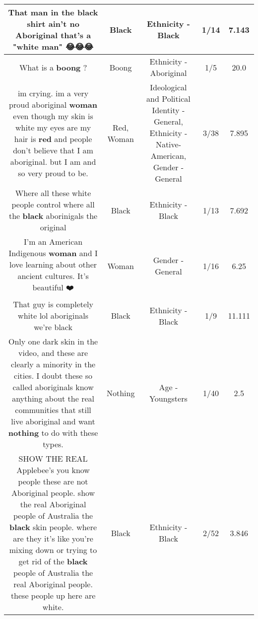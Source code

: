 \documentclass[11pt]{article}
\newlength\mylength
\begin{document}
\begin{center}
\begin{longtable}{|C{.65\mylength}|C{.30\mylength}|C{.12\mylength}|C{.12\mylength}|C{.12\mylength}|}
  \small That man in the \textbf{black} shirt ain't no Aboriginal that's a "white man" 😂😂😂\normalsize   & Black & Ethnicity - Black & 1/14 & 7.143 \\  \hline
  \small What is a \textbf{boong} ?\normalsize   & Boong & Ethnicity - Aboriginal & 1/5 & 20.0 \\  \hline
  \small im crying. im a very proud aboriginal \textbf{woman} even though my skin is white my eyes are my hair is \textbf{r\textbf{ed}} and  people don't believe that I am aboriginal. but I am and so very proud to be.\normalsize   & Red, Woman &  Ideological and Political Identity - General, Ethnicity - Native-American, Gender - General & 3/38 & 7.895 \\  \hline
  \small Where all these white people control where all the \textbf{black} aborinigals the original\normalsize   & Black & Ethnicity - Black & 1/13 & 7.692 \\  \hline
  \small I'm an American Indigenous \textbf{woman} and I love learning about other ancient cultures. It's beautiful ❤️\normalsize   & Woman & Gender - General & 1/16 & 6.25 \\  \hline
  \small That guy is completely white lol aboriginals we're black\normalsize   & Black & Ethnicity - Black & 1/9 & 11.111 \\  \hline
  \small Only one dark skin in the video, and these are clearly a minority in the cities. I doubt these so called aboriginals know anything about the real communities that still live aboriginal and want \textbf{nothing} to do with these types.\normalsize   & Nothing & Age - Youngsters & 1/40 & 2.5 \\  \hline
  \small SHOW THE REAL Applebee's you know people these are not Aboriginal people. show the real Aboriginal people of Australia the \textbf{black} skin people. where are they it's like you're mixing down or trying to get rid of the \textbf{black} people of Australia the real Aboriginal people. these people up here are white.\normalsize   & Black & Ethnicity - Black & 2/52 & 3.846 \\  \hline

\end{longtable}
\end{center}
\end{document}

